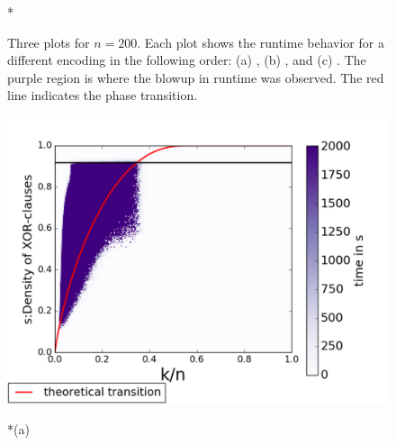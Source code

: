 \begin{figure}
\begin{multicols}{3}
		*{\cardnet}
	\end{multicols}
	\caption{Three plots for $n=200$. Each plot shows the runtime behavior for a different encoding in the following order: (a) \adder, (b) \bdd, and (c) \cardnet. The purple region is where the blowup in runtime was observed. The red line indicates the phase transition.\label{fig:enccomp}}
\end{figure}

\begin{figure}
	\begin{multicols}{2}
		\includegraphics[width=\linewidth,height=\linewidth]{pb-experiments/polarity-false/adder/250.pdf}\par
		*{(a)}

\end{multicols}
\end{figure}
